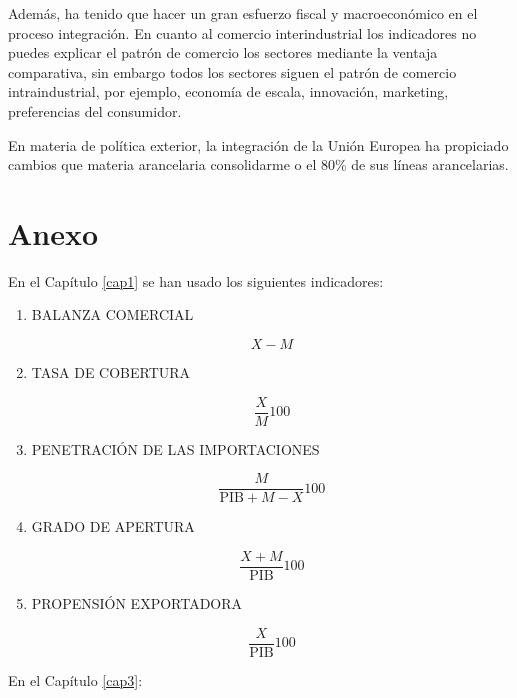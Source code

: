 \documentclass[a4paper,openright,12pt]{book}
\begin{document}
Además, ha tenido que hacer un gran esfuerzo fiscal y macroeconómico en el proceso integración. En cuanto al comercio interindustrial los indicadores no puedes explicar el patrón de comercio los sectores mediante la ventaja comparativa, sin embargo todos los sectores siguen el patrón de comercio intraindustrial, por ejemplo, economía de escala, innovación, marketing, preferencias del consumidor.

En materia de política exterior, la integración de la Unión Europea ha propiciado cambios que materia arancelaria consolidarme o el 80\% de sus líneas arancelarias.


\chapter{Anexo}
\pagestyle{empty}
\thispagestyle{empty}
En el Capítulo \ref{cap1} se han usado los siguientes indicadores:

\begin{enumerate}
    \item BALANZA COMERCIAL

    $$X - M$$
    \item TASA DE COBERTURA

    $$\frac{X}{M}100$$
    \item PENETRACIÓN DE LAS IMPORTACIONES

    $$\frac{M}{\text{PIB} + M - X} 100$$
    \item GRADO DE APERTURA

    $$\frac{X+M}{\text{PIB}} 100$$
    \item PROPENSIÓN EXPORTADORA

    $$\frac{X}{\text{PIB}} 100$$

\end{enumerate}

En el Capítulo \ref{cap3}:
\end{document}
